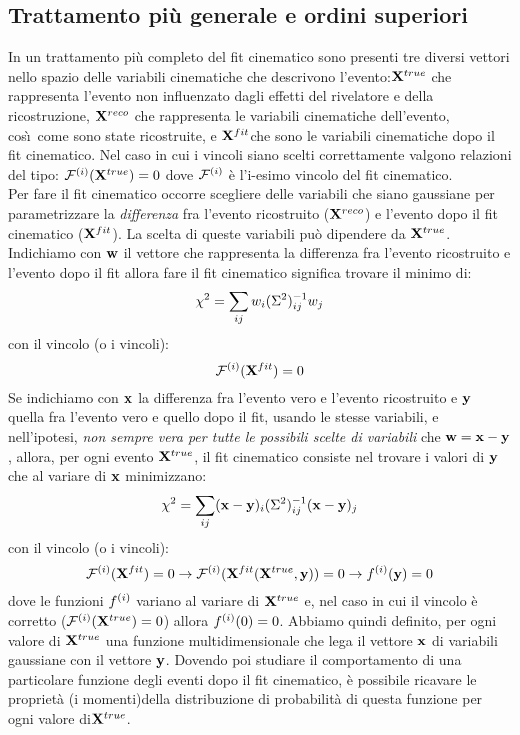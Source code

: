 \subsection{Trattamento pi\`u generale e ordini superiori}
%
In un trattamento pi\`u completo del fit cinematico sono presenti tre diversi vettori nello spazio delle variabili cinematiche che descrivono l'evento:${\bf X}^{true}$ che rappresenta l'evento non influenzato dagli effetti del
rivelatore e della ricostruzione, ${\bf X}^{reco}$ che rappresenta le variabili cinematiche dell'evento, cos\`\i\ come sono state ricostruite, e ${\bf X}^{fit}$che sono le variabili cinematiche dopo il fit cinematico. Nel caso in cui i
vincoli siano scelti correttamente valgono relazioni del tipo: ${\cal F}^{(i)}({\bf X}^{true})=0$ dove ${\cal F}^{(i)}$ \`e l'i-esimo vincolo del fit cinematico.\\
Per fare il fit cinematico occorre scegliere delle variabili che siano gaussiane
per parametrizzare la {\em differenza} fra l'evento ricostruito (${\bf X}^{reco}$)
e l'evento dopo il fit cinematico (${\bf X}^{fit}$). La scelta di queste variabili
pu\`o dipendere da ${\bf X}^{true}$. Indichiamo con ${\bf w}$ il vettore che
rappresenta la differenza fra l'evento ricostruito e l'evento dopo il fit allora
fare il fit cinematico significa trovare il minimo di:
\[\chi^2=\sum_{ij}w_i(\Sigma^2)^{-1}_{ij}w_j\]
con il vincolo (o i vincoli):\[{\cal F}^{(i)}({\bf X}^{fit})=0\]
Se indichiamo con ${\bf x}$ la differenza fra l'evento vero e l'evento ricostruito
e ${\bf y}$ quella fra l'evento vero e quello dopo il fit, usando le stesse variabili,
e nell'ipotesi, {\em non sempre vera per tutte le possibili scelte di variabili}
che ${\bf w}={\bf x}-{\bf y}$, allora, per ogni evento ${\bf X}^{true}$, il fit cinematico
consiste nel trovare i valori di ${\bf y}$ che al variare di ${\bf x}$ minimizzano:
\[\chi^2=\sum_{ij}({\bf x}-{\bf y})_i(\Sigma^2)^{-1}_{ij}({\bf x}-{\bf y})_j\]
con il vincolo (o i vincoli):
\begin{equation}
\label{vincoli}
{\cal F}^{(i)}({\bf X}^{fit})=0\rightarrow{\cal F}^{(i)}({\bf X}^{fit}({\bf X}^{true},{\bf y}))=0\rightarrow f^{(i)}({\bf y})=0
\end{equation}
dove le funzioni $f^{(i)}$ variano al variare di ${\bf X}^{true}$ e, nel caso in cui
il vincolo \`e corretto (${\cal F}^{(i)}({\bf X}^{true})=0$) allora $f^{(i)}(0)=0$.
Abbiamo quindi definito, per ogni valore di ${\bf X}^{true}$ una funzione multidimensionale che lega il vettore ${\bf x}$ di variabili gaussiane con il vettore ${\bf y}$. Dovendo poi studiare il comportamento di una particolare funzione degli eventi dopo il fit cinematico, \`e possibile ricavare le propriet\`a (i momenti)della distribuzione di probabilit\`a di questa funzione per ogni valore di${\bf X}^{true}$.\\
